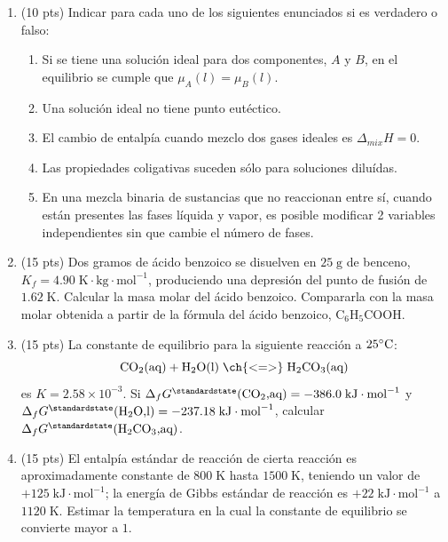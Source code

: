 \documentclass[a4paper,12pt]{article}
\begin{document}
\begin{enumerate}

 \item (10 pts) Indicar para cada uno de los siguientes enunciados si es verdadero o falso: %
\begin{enumerate}
 \item Si se tiene una soluci\'on ideal para dos componentes, $A$ y $B$, en el equilibrio se cumple que $\mu_A(l)=\mu_B(l)$.
 \item Una soluci\'on ideal no tiene punto eut\'ectico.
 \item El cambio de entalp\'ia cuando mezclo dos gases ideales es $\Delta_{mix}H=0$.
 \item Las propiedades coligativas suceden s\'olo para soluciones dilu\'idas.
 \item En una mezcla binaria de sustancias que no reaccionan entre s\'i, cuando est\'an presentes las fases l\'iquida y vapor, es posible modificar 2 variables independientes sin que cambie el n\'umero de fases.
\end{enumerate}

 \item (15 pts) Dos gramos de \'acido benzoico se disuelven en $25\;\mbox{g}$ de benceno, $K_f=4.90\;\mbox{K}\cdot\mbox{kg}\cdot\mbox{mol}^{-1}$, produciendo una depresi\'on del punto de fusi\'on de $1.62\;\mbox{K}$. Calcular la masa molar del \'acido benzoico. Compararla con la masa molar obtenida a partir de la f\'ormula del \'acido benzoico, $\mbox{C}_6\mbox{H}_5\mbox{COOH}$. %

 \item (15 pts) La constante de equilibrio para la siguiente reacci\'on a $25\celsius$:
$$\mbox{CO}_2\mbox{(aq)}+\mbox{H}_2\mbox{O(l)}\;\ch{ <=> }\;\mbox{H}_2\mbox{CO}_3\mbox{(aq)}$$
es $K=2.58\times 10^{-3}$. Si $\Delta_fG^\standardstate(\mbox{CO}_2\mbox{,aq})=-386.0\;\mbox{kJ}\cdot\mbox{mol}^{-1}$ y $\Delta_fG^\standardstate(\mbox{H}_2\mbox{O,l})=-237.18\;\mbox{kJ}\cdot\mbox{mol}^{-1}$, calcular $\Delta_fG^\standardstate(\mbox{H}_2\mbox{CO}_3\mbox{,aq})$. %

 \item (15 pts) El entalp\'ia est\'andar de reacci\'on de cierta reacci\'on es aproximadamente constante de $800\;\mbox{K}$ hasta $1500\;\mbox{K}$, teniendo un valor de $+125\;\mbox{kJ}\cdot\mbox{mol}^{-1}$; la energ\'ia de Gibbs est\'andar de reacci\'on es $+22\;\mbox{kJ}\cdot\mbox{mol}^{-1}$ a $1120\;\mbox{K}$. Estimar la temperatura en la cual la constante de equilibrio se convierte mayor a $1$. %


\end{enumerate}
\end{document}
